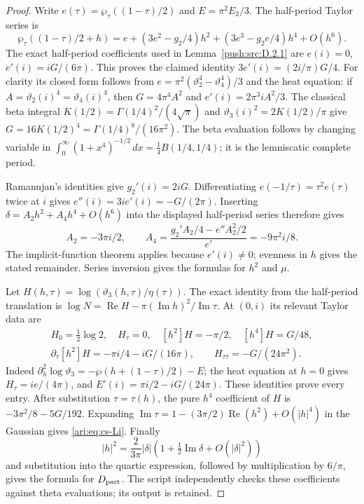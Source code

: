 \begin{proof}
Write $e(\tau)=\wp_\tau((1-\tau)/2)$ and
$E=\pi^2E_2/3$. The half-period Taylor series is
\[
 \wp_\tau((1-\tau)/2+h)
 =e+(3e^2-g_2/4)h^2+(3e^3-g_2e/4)h^4+O(h^6).
\]
The exact half-period coefficients used in Lemma~\ref{push:src:D.2.1} are
$e(i)=0$, $e'(i)=iG/(6\pi)$. This proves the claimed identity
$3e'(i)=(2i/\pi)G/4$. For clarity its closed form follows from
$e=\pi^2(\vartheta_2^4-\vartheta_4^4)/3$ and the heat equation:
if $A=\vartheta_2(i)^4=\vartheta_4(i)^4$, then
$G=4\pi^4A^2$ and $e'(i)=2\pi^3iA^2/3$.
The classical beta integral
$K(1/2)=\Gamma(1/4)^2/(4\sqrt\pi)$ and
$\vartheta_3(i)^2=2K(1/2)/\pi$ give
$G=16K(1/2)^4=\Gamma(1/4)^8/(16\pi^2)$.
The beta evaluation follows by changing variable in
$\int_0^\infty(1+x^4)^{-1/2}\,dx
=\tfrac14 B(1/4,1/4)$; it is the lemniscatic complete period.

Ramanujan's identities give $g_2'(i)=2iG$. Differentiating
$e(-1/\tau)=\tau^2 e(\tau)$ twice at $i$ gives
$e''(i)=3i e'(i)=-G/(2\pi)$. Inserting
$\delta=A_2h^2+A_4h^4+O(h^6)$ into the displayed half-period series
therefore gives
\[
 A_2=-3\pi i/2,\qquad
 A_4=\frac{g_2'A_2/4-e''A_2^2/2}{e'}=-9\pi^2i/8.
\]
The implicit-function theorem applies because $e'(i)\ne0$;
evenness in $h$ gives the stated remainder. Series inversion gives
the formulas for $h^2$ and $\mu$.

Let $H(h,\tau)=\log(\vartheta_3(h,\tau)/\eta(\tau))$. The exact
identity from the half-period translation is
$\log N=\operatorname{Re}H-\pi(\operatorname{Im}h)^2/
\operatorname{Im}\tau$. At $(0,i)$ its relevant Taylor data are
\[
 \begin{gathered}
 H_0=\tfrac12\log2,\quad H_\tau=0,\quad
 [h^2]H=-\pi/2,\quad [h^4]H=G/48,\\
 \partial_\tau[h^2]H=-\pi i/4-iG/(16\pi),\qquad
 H_{\tau\tau}=-G/(24\pi^2).
 \end{gathered}
\]
Indeed $\partial_h^2\log\vartheta_3=-\wp(h+(1-\tau)/2)-E$;
the heat equation at $h=0$ gives $H_\tau=ie/(4\pi)$, and
$E'(i)=\pi i/2-iG/(24\pi)$. These identities prove every entry.
After substitution $\tau=\tau(h)$, the pure $h^4$ coefficient of
$H$ is $-3\pi^2/8-5G/192$. Expanding
$\operatorname{Im}\tau=1-(3\pi/2)\operatorname{Re}(h^2)+O(|h|^4)$
in the Gaussian gives \eqref{ari:eq:cs-Li}. Finally
\[
 |h|^2=\frac{2}{3\pi}|\delta|
          \left(1+\tfrac12\operatorname{Im}\delta+O(|\delta|^2)\right)
\]
and substitution into the quartic expression, followed by
multiplication by $6/\pi$, gives the formula for $D_{\rm part}$.
The script  independently checks
these coefficients against theta evaluations; its output is retained.
\end{proof}

